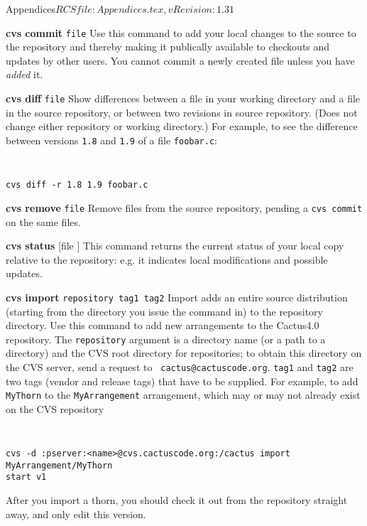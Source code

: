 \begin{cactuspart}{6}{Appendices}{$RCSfile: Appendices.tex,v $}{$Revision: 1.31 $}
\begin{Lentry}
\item[{\bf cvs commit} {\tt file}]
Use this command to add your local changes to the source to
the repository and thereby making it publically available to
checkouts and updates by other users. You cannot commit a
newly created file unless you have {\it added} it.

\item[{\bf cvs diff} {\tt file}]
Show differences between a file in your working directory
and  a file in the source repository, or between two revisions in
source repository.  (Does not change either repository or working
directory.) For example, to see the difference between versions
{\tt 1.8} and {\tt 1.9} of a file {\tt foobar.c}:

{\tt
\begin{verbatim}
cvs diff -r 1.8 1.9 foobar.c
\end{verbatim}
}

\item[{\bf cvs remove} {\tt file}]
Remove files from the source repository, pending  a {\tt cvs commit} on
the same files.

\item[{\bf cvs status} [file]]
This command returns the current status of your local copy relative to
the repository: e.g. it indicates local modifications and possible
updates.

\item[{\bf cvs import} {\tt repository tag1 tag2}]
Import adds an entire source distribution (starting from the
directory you issue the command in) to the repository directory.
Use this command to add new arrangements to the Cactus4.0 repository. The
{\tt repository} argument is a directory name (or a path to a
directory) and the CVS root directory for repositories; to obtain this
directory on the CVS server, send a request to {\tt
cactus@cactuscode.org}. {\tt tag1} and {\tt tag2} are two tags (vendor
 and release tags) that have to be supplied. For example, to add {\tt MyThorn}
to the {\tt MyArrangement} arrangement, which may or may not already exist on
the CVS repository

{\tt
\begin{verbatim}
cvs -d :pserver:<name>@cvs.cactuscode.org:/cactus import MyArrangement/MyThorn
start v1
\end{verbatim}
}

After you import a thorn, you should check it out from the repository straight
away, and only edit this version.

\end{Lentry}


\end{cactuspart}

